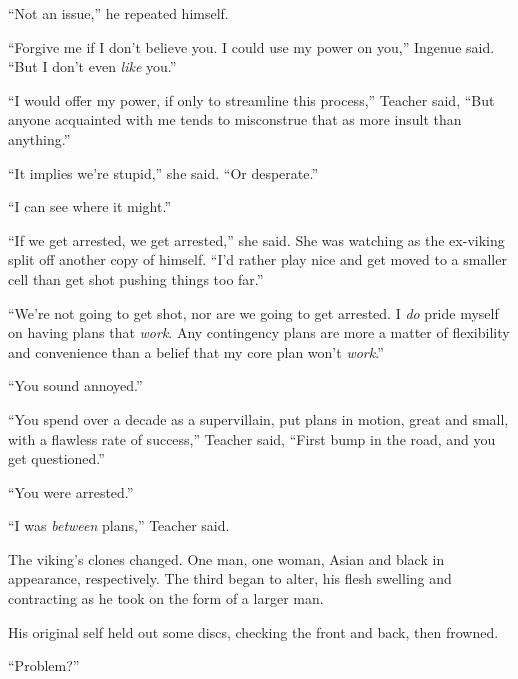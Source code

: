``Not an issue,'' he repeated himself.



``Forgive me if I don't believe you.  I could use my power on you,'' Ingenue said.  ``But I don't even \emph{like} you.''



``I would offer my power, if only to streamline this process,'' Teacher said, ``But anyone acquainted with me tends to misconstrue that as more insult than anything.''



``It implies we're stupid,'' she said.  ``Or desperate.''



``I can see where it might.''



``If we get arrested, we get arrested,'' she said.  She was watching as the ex-viking split off another copy of himself.  ``I'd rather play nice and get moved to a smaller cell than get shot pushing things too far.''



``We're not going to get shot, nor are we going to get arrested.  I \emph{do} pride myself on having plans that \emph{work}.  Any contingency plans are more a matter of flexibility and convenience than a belief that my core plan won't \emph{work}.''



``You sound annoyed.''



``You spend over a decade as a supervillain, put plans in motion, great and small, with a flawless rate of success,'' Teacher said, ``First bump in the road, and you get questioned.''



``You were arrested.''



``I was \emph{between} plans,'' Teacher said.



The viking's clones changed.  One man, one woman, Asian and black in appearance, respectively.  The third began to alter, his flesh swelling and contracting as he took on the form of a larger man.



His original self held out some discs, checking the front and back, then frowned.



``Problem?''



